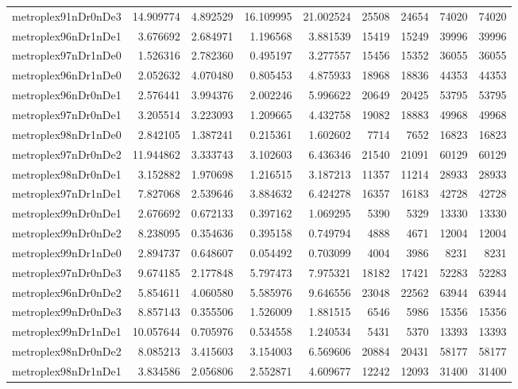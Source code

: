 \begin{longtable}{|l|r|r|r|r|r|r|r|r|}
metroplex91nDr0nDe3 & 14.909774 & 4.892529 & 16.109995 & 21.002524 & 25508 & 24654 & 74020 & 74020 \\
metroplex96nDr1nDe1 & 3.676692 & 2.684971 & 1.196568 & 3.881539 & 15419 & 15249 & 39996 & 39996 \\
metroplex97nDr1nDe0 & 1.526316 & 2.782360 & 0.495197 & 3.277557 & 15456 & 15352 & 36055 & 36055 \\
metroplex96nDr1nDe0 & 2.052632 & 4.070480 & 0.805453 & 4.875933 & 18968 & 18836 & 44353 & 44353 \\
metroplex96nDr0nDe1 & 2.576441 & 3.994376 & 2.002246 & 5.996622 & 20649 & 20425 & 53795 & 53795 \\
metroplex97nDr0nDe1 & 3.205514 & 3.223093 & 1.209665 & 4.432758 & 19082 & 18883 & 49968 & 49968 \\
metroplex98nDr1nDe0 & 2.842105 & 1.387241 & 0.215361 & 1.602602 & 7714 & 7652 & 16823 & 16823 \\
metroplex97nDr0nDe2 & 11.944862 & 3.333743 & 3.102603 & 6.436346 & 21540 & 21091 & 60129 & 60129 \\
metroplex98nDr0nDe1 & 3.152882 & 1.970698 & 1.216515 & 3.187213 & 11357 & 11214 & 28933 & 28933 \\
metroplex97nDr1nDe1 & 7.827068 & 2.539646 & 3.884632 & 6.424278 & 16357 & 16183 & 42728 & 42728 \\
metroplex99nDr0nDe1 & 2.676692 & 0.672133 & 0.397162 & 1.069295 & 5390 & 5329 & 13330 & 13330 \\
metroplex99nDr0nDe2 & 8.238095 & 0.354636 & 0.395158 & 0.749794 & 4888 & 4671 & 12004 & 12004 \\
metroplex99nDr1nDe0 & 2.894737 & 0.648607 & 0.054492 & 0.703099 & 4004 & 3986 & 8231 & 8231 \\
metroplex97nDr0nDe3 & 9.674185 & 2.177848 & 5.797473 & 7.975321 & 18182 & 17421 & 52283 & 52283 \\
metroplex96nDr0nDe2 & 5.854611 & 4.060580 & 5.585976 & 9.646556 & 23048 & 22562 & 63944 & 63944 \\
metroplex99nDr0nDe3 & 8.857143 & 0.355506 & 1.526009 & 1.881515 & 6546 & 5986 & 15356 & 15356 \\
metroplex99nDr1nDe1 & 10.057644 & 0.705976 & 0.534558 & 1.240534 & 5431 & 5370 & 13393 & 13393 \\
metroplex98nDr0nDe2 & 8.085213 & 3.415603 & 3.154003 & 6.569606 & 20884 & 20431 & 58177 & 58177 \\
metroplex98nDr1nDe1 & 3.834586 & 2.056806 & 2.552871 & 4.609677 & 12242 & 12093 & 31400 & 31400 \\

\end{longtable}
